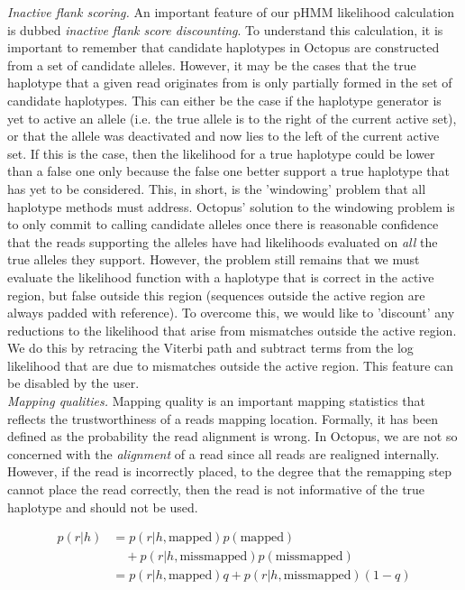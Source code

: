 \documentclass[notitlepage, twocolumn]{article}
\begin{document}
\emph{Inactive flank scoring.} An important feature of our pHMM likelihood calculation is dubbed \emph{inactive flank score discounting}. To understand this calculation, it is important to remember that candidate haplotypes in Octopus are constructed from a set of candidate alleles. However, it may be the cases that the true haplotype that a given read originates from is only partially formed in the set of candidate haplotypes. This can either be the case if the haplotype generator is yet to active an allele (i.e. the true allele is to the right of the current active set), or that the allele was deactivated and now lies to the left of the current active set. If this is the case, then the likelihood for a true haplotype could be lower than a false one only because the false one better support a true haplotype that has yet to be considered. This, in short, is the 'windowing' problem that all haplotype methods must address. Octopus' solution to the windowing problem is to only commit to calling candidate alleles once there is reasonable confidence that the reads supporting the alleles have had likelihoods evaluated on \emph{all} the true alleles they support. However, the problem still remains that we must evaluate the likelihood function with a haplotype that is correct in the active region, but false outside this region (sequences outside the active region are always padded with reference). To overcome this, we would like to 'discount' any reductions to the likelihood that arise from mismatches outside the active region. We do this by retracing the Viterbi path and subtract terms from the log likelihood that are due to mismatches outside the active region. This feature can be disabled by the user.\\

\emph{Mapping qualities.} Mapping quality is an important mapping statistics that reflects the trustworthiness of a reads mapping location. Formally, it has been defined as the probability the read alignment is wrong. In Octopus, we are not so concerned with the \emph{alignment} of a read since all reads are realigned internally. However, if the read is incorrectly placed, to the degree that the remapping step cannot place the read correctly, then the read is not informative of the true haplotype and should not be used. 

\begin{align*}
	p(r | h) &= p(r | h, \text{mapped})p(\text{mapped}) \\
              & \quad + p(r | h, \text{missmapped})p(\text{missmapped})\\
	         &= p(r | h, \text{mapped})q + p(r | h, \text{missmapped})(1 - q)
\end{align*}
\end{document}
